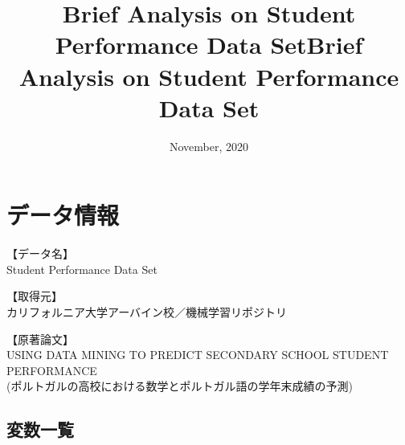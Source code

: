 \documentclass[9pt]{ltjsarticle}
\title{Brief Analysis on Student Performance Data Set}
\title{\textbf{Brief Analysis on Student Performance Data Set} }
\date{November, 2020}
\begin{document}
    
    \maketitle

\tableofcontents

    

    
    \hypertarget{ux30c7ux30fcux30bfux60c5ux5831}{%
\section{データ情報}\label{ux30c7ux30fcux30bfux60c5ux5831}}

【データ名】\\ Student Performance Data Set

【取得元】\\ カリフォルニア大学アーバイン校／機械学習リポジトリ\cite{uci}

【原著論文】\\USING DATA MINING TO PREDICT SECONDARY SCHOOL STUDENT PERFORMANCE \cite{cortez}
 \\
(ポルトガルの高校における数学とポルトガル語の学年末成績の予測)
\newpage
    \hypertarget{ux5909ux6570ux4e00ux89a7}{%
\subsection{変数一覧}\label{ux5909ux6570ux4e00ux89a7}}
\end{document}
